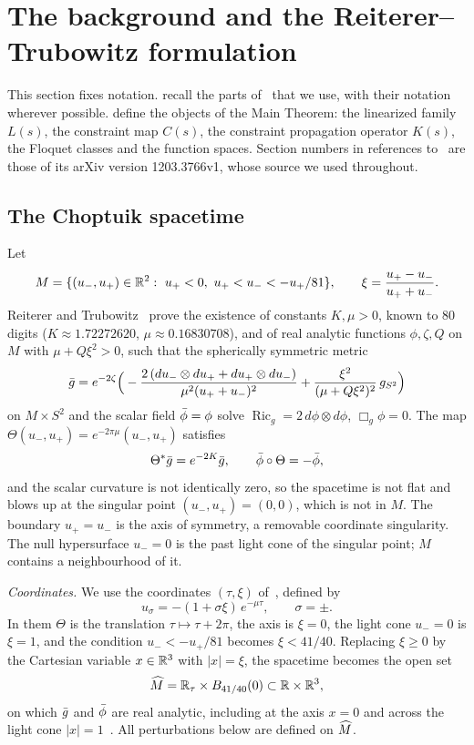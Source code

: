 \section{The background and the Reiterer--Trubowitz formulation}\label{sec:setting}

This section fixes notation.  recall the parts
of~\cite{RT2019} that we use, with their notation wherever possible. 
define the objects of the Main Theorem: the linearized family $L(s)$, the constraint map $C(s)$, the
constraint propagation operator $K(s)$, the Floquet classes and the function spaces.
Section numbers in references to~\cite{RT2019} are those of its arXiv version 1203.3766v1, whose source we
used throughout.

\subsection{The Choptuik spacetime}\label{sec:setting-background}

Let
\[
  M=\{(u_-,u_+)\in\R^2:\ u_+<0,\ u_+<u_-<-u_+/81\},\qquad
  \xi=\frac{u_+-u_-}{u_++u_-}.
\]
Reiterer and Trubowitz~\cite[Main result]{RT2019} prove the existence of constants $K,\mu>0$, known to
$80$ digits ($K\approx1.72272620$, $\mu\approx0.16830708$), and of real analytic functions
$\phi,\zeta,Q$ on $M$ with $\mu+Q\xi^2>0$, such that the spherically symmetric metric
\begin{equation}\label{eq:metric}
  \bar g=e^{-2\zeta}\Big(-\frac{2\,(du_-\otimes du_++du_+\otimes du_-)}{\mu^2(u_++u_-)^2}
  +\frac{\xi^2}{(\mu+Q\xi^2)^2}\,g_{S^2}\Big)
\end{equation}
on $M\times S^2$ and the scalar field $\bar\phi=\phi$ solve
$\operatorname{Ric}_g=2\,d\phi\otimes d\phi$, $\Box_g\phi=0$. The map
$\Theta(u_-,u_+)=e^{-2\pi\mu}(u_-,u_+)$ satisfies
\[
  \Theta^*\bar g=e^{-2K}\bar g,\qquad \bar\phi\circ\Theta=-\bar\phi,
\]
and the scalar curvature is not identically zero, so the spacetime is not flat and blows up at the
singular point $(u_-,u_+)=(0,0)$, which is not in $M$. The boundary $u_+=u_-$ is the axis of symmetry, a
removable coordinate singularity. The null hypersurface $u_-=0$ is the past light cone of the singular
point; $M$ contains a neighbourhood of it.

\emph{Coordinates.} We use the coordinates $(\tau,\xi)$ of~\cite{RT2019}, defined by
\begin{equation}\label{eq:tauxi}
  u_\sigma=-(1+\sigma\xi)\,e^{-\mu\tau},\qquad\sigma=\pm.
\end{equation}
In them $\Theta$ is the translation $\tau\mapsto\tau+2\pi$, the axis is $\xi=0$, the light cone $u_-=0$ is
$\xi=1$, and the condition $u_-<-u_+/81$ becomes $\xi<41/40$. Replacing $\xi\ge0$ by the Cartesian
variable $x\in\mathbb{R}^3$ with $|x|=\xi$, the spacetime becomes the open set
\[
  \widehat M=\mathbb{R}_\tau\times B_{41/40}(0)\subset\mathbb{R}\times\mathbb{R}^3,
\]
on which $\bar g$ and $\bar\phi$ are real analytic, including at the axis $x=0$ and across the light cone
$|x|=1$~\cite{RT2019}. All perturbations below are defined on $\widehat M$.

